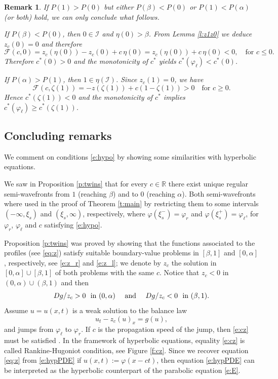 \documentclass[11pt,a4paper]{article}
\newcommand{\R}{\mathbb R}
\newtheorem{remark}{Remark}[section]
\renewcommand{\phi}{\varphi}
\begin{document}
\begin{remark}
{
\rm If $P(1)>P(0)$ but either $P(\beta)<P(0)$ or $P(1)<P(\alpha)$ (or both) hold, we can only conclude what follows.

If $P(\beta)<P(0)$, then $0 \in \mathcal I$ and $\eta(0)>\beta$. From Lemma \ref{l:z1z0} we deduce $z_c(0)=0$ and therefore
\[
\mathcal F(c,0)=
z_c\left(\eta(0)\right)-z_c(0)+c\, \eta(0)=z_c\left(\eta(0)\right)+c\, \eta(0) <0, 
\quad \text{for } c \le 0.
\]
Therefore $c^*(0)>0$ and the monotonicity of $c^*$ yields $c^*(\varphi_\ell) < c^*(0)$.

If $P(\alpha)>P(1)$, then $1 \in \eta(\mathcal I)$. Since $z_c(1)=0$, we have
\[
\mathcal F\left(c, \zeta(1)\right)=
-z\left(\zeta(1)\right)+c\left(1-\zeta(1)\right) >0 \quad \text{for } c \ge 0.
\]
Hence $c^*(\zeta(1))<0$ and the monotonicity of $c^*$ implies
$c^*(\varphi_\ell) \ge c^*(\zeta(1))$.
}
\end{remark}

\subsection{Concluding remarks}\label{ss:concluding-remark}
We comment on conditions \eqref{e:hypo} by showing some similarities with hyperbolic equations. 

We saw in Proposition \ref{p:twins} that for every $c\in\R$ there exist unique regular semi-wavefronts from $1$ (reaching $\beta$) and to $0$ (reaching $\alpha$). Both semi-wavefronts where used in the proof of Theorem \ref{t:main} by restricting them to some intervals $(-\infty,\xi_s)$ and $(\xi_s,\infty)$, respectively, where $\phi(\xi_s^-)=\phi_r$ and $\phi(\xi_s^+)=\phi_\ell$, for  $\phi_r$, $\phi_\ell$ and $c$ satisfying \eqref{e:hypo}. 

Proposition \ref{p:twins} was proved by showing that the functions associated to the profiles (see \eqref{eq:z}) satisfy suitable boundary-value problems in $[\beta,1]$ and $[0,\alpha]$, respectively, see \eqref{e:z_r} and \eqref{e:z_l}; we denote by $z_c$ the solution in $[0,\alpha] \cup[\beta,1]$ of both problems with the same $c$. Notice that $z_c<0$ in $(0,\alpha) \cup(\beta,1)$ and then
\begin{equation}\label{e:Dgsign}
Dg/z_c>0\  \hbox{ in }(0,\alpha)\quad \hbox{ and } \quad Dg/z_c<0\ \hbox{ in }(\beta,1). 
\end{equation}
Assume $u=u(x,t)$ is a weak solution to the balance law
\begin{equation}\label{e:hypPDE}
u_t-z_c(u)_x=g(u),
\end{equation}
and jumps from $\phi_\ell$ to $\phi_r$. If $c$ is the propagation speed of the jump, then  \eqref{e:cz} must be satisfied \cite{Bressan, Dafermos}. In the framework of hyperbolic equations, equality \eqref{e:cz} is called Rankine-Hugoniot condition, see Figure \ref{f:cz}.
Since we recover equation \eqref{eq:z} from \eqref{e:hypPDE} if $u(x,t):=\phi(x-ct)$, then
 equation \eqref{e:hypPDE} can be interpreted as the hyperbolic counterpart of the parabolic equation \eqref{e:E}.
\end{document}
